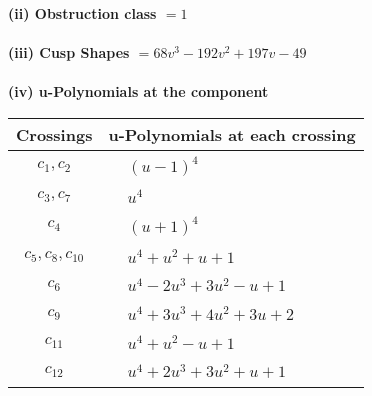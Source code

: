 \documentclass[1p]{elsarticle_modified}
\theoremstyle{definition}
\begin{document}
\flushleft \textbf{(ii) Obstruction class $= 1$}\\~\\
\flushleft \textbf{(iii) Cusp Shapes $= 68 v^3-192 v^2+197 v-49$}\\~\\
\newpage\renewcommand{\arraystretch}{1}
\flushleft \textbf{(iv) u-Polynomials at the component}\newline \\
\begin{tabular}{m{50pt}|m{274pt}}
Crossings & \hspace{64pt}u-Polynomials at each crossing \\
\hline $$\begin{aligned}c_{1},c_{2}\end{aligned}$$&$\begin{aligned}
&(u-1)^4
\end{aligned}$\\
\hline $$\begin{aligned}c_{3},c_{7}\end{aligned}$$&$\begin{aligned}
&u^4
\end{aligned}$\\
\hline $$\begin{aligned}c_{4}\end{aligned}$$&$\begin{aligned}
&(u+1)^4
\end{aligned}$\\
\hline $$\begin{aligned}c_{5},c_{8},c_{10}\end{aligned}$$&$\begin{aligned}
&u^4+u^2+u+1
\end{aligned}$\\
\hline $$\begin{aligned}c_{6}\end{aligned}$$&$\begin{aligned}
&u^4-2 u^3+3 u^2- u+1
\end{aligned}$\\
\hline $$\begin{aligned}c_{9}\end{aligned}$$&$\begin{aligned}
&u^4+3 u^3+4 u^2+3 u+2
\end{aligned}$\\
\hline $$\begin{aligned}c_{11}\end{aligned}$$&$\begin{aligned}
&u^4+u^2- u+1
\end{aligned}$\\
\hline $$\begin{aligned}c_{12}\end{aligned}$$&$\begin{aligned}
&u^4+2 u^3+3 u^2+u+1
\end{aligned}$\\
\hline
\end{tabular}\\~\\
\end{document}
